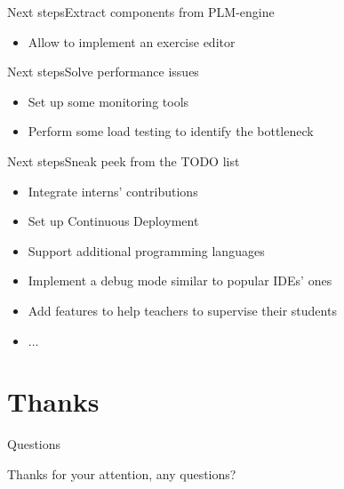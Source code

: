 \documentclass{beamer}
\begin{document}
\begin{frame}{Next steps}{Extract components from PLM-engine}
\begin{center}
  \end{center}
  \begin{itemize}
  \item {
    Allow to implement an exercise editor
  }
  \end{itemize}
\end{frame}

\begin{frame}{Next steps}{Solve performance issues}
  \begin{itemize}
  \item {
    Set up some monitoring tools
  }
  \item {
    Perform some load testing to identify the bottleneck
  }
  \end{itemize}
\end{frame}

\begin{frame}{Next steps}{Sneak peek from the TODO list}
  \begin{itemize}
  \item Integrate interns' contributions
  \item Set up Continuous Deployment
  \item Support additional programming languages
  \item Implement a debug mode similar to popular IDEs' ones
  \item Add features to help teachers to supervise their students
  \item ...
  \end{itemize}
\end{frame}

\section*{Thanks}

\begin{frame}{Questions}
  \begin{center}
    Thanks for your attention, any questions?
  \end{center}
\end{frame}
\end{document}
